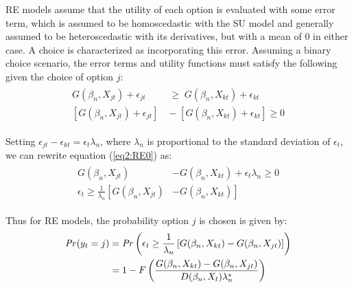 \documentclass[../main.tex]{subfiles}
\begin{document}
RE models assume that the utility of each option is evaluated with some error term, which is assumed to be homoscedastic with the SU model and generally assumed to be heteroscedastic with its derivatives, but with a mean of $0$ in either case.
A choice is characterized as incorporating this error.
Assuming a binary choice scenario, the error terms and utility functions must satisfy the following given the choice of option $j$:
\begin{align}
	\label{eq2:RE0}
	\begin{split}
		G(\beta_n,X_{jt}) + \epsilon_{jt} \;&\geq\; G(\beta_n,X_{kt}) + \epsilon_{kt}\\
		\left[G(\beta_n,X_{jt}) + \epsilon_{jt}\right] \;&-\; \left[G(\beta_n,X_{kt}) + \epsilon_{kt}\right] \geq 0
	\end{split}
\end{align}

\noindent Setting $\epsilon_{jt} - \epsilon_{kt} = \epsilon_t\lambda_n$, where $\lambda_n$ is proportional to the standard deviation of $\epsilon_t$,{\footnotemark} we can rewrite equation (\ref{eq2:RE0}) as:
\begin{align}
	\label{eq2:RE1}
	\begin{split}
		G(\beta_n,X_{jt}) &- G(\beta_n,X_{kt}) + \epsilon_t\lambda_n \geq 0\\
		\epsilon_t \geq \frac{1}{\lambda_n} \left[ G(\beta_n,X_{jt}) \right.  &- \left. G(\beta_n,X_{kt}) \right]
	\end{split}
\end{align}

\addtocounter{footnote}{-1}

\noindent Thus for RE models, the probability option $j$ is chosen is given by:
\begin{align}
	\label{eq2:RE.2}
	\begin{split}
	{\ensuremath{\mathit{Pr}}}(y_t = j) &= {\mathit{Pr}}\left(  \epsilon_t \geq \frac{1}{\lambda_n} \left[ G(\beta_n,X_{kt}) - G(\beta_n,X_{jt}) \right] \right)\\
	&= 1 - F\left( \dfrac{G(\beta_n,X_{kt}) - G(\beta_n,X_{jt})}{D(\beta_n,X_t)\lambda_n^* }  \right)
	\end{split}
\end{align}
\end{document}
